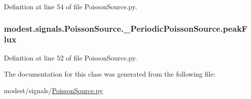 Definition at line 54 of file Poisson\+Source.\+py.

\subsubsection[{\texorpdfstring{peak\+Flux}{peakFlux}}]{\setlength{\rightskip}{0pt plus 5cm}modest.\+signals.\+Poisson\+Source.\+\_\+\+Periodic\+Poisson\+Source.\+peak\+Flux}\hypertarget{classmodest_1_1signals_1_1PoissonSource_1_1__PeriodicPoissonSource_a51d0bebe6b273f99cba60f17b6ff32b8}{}\label{classmodest_1_1signals_1_1PoissonSource_1_1__PeriodicPoissonSource_a51d0bebe6b273f99cba60f17b6ff32b8}


Definition at line 52 of file Poisson\+Source.\+py.



The documentation for this class was generated from the following file\+:\begin{DoxyCompactItemize}
\item 
modest/signals/\hyperlink{PoissonSource_8py}{Poisson\+Source.\+py}\end{DoxyCompactItemize}
